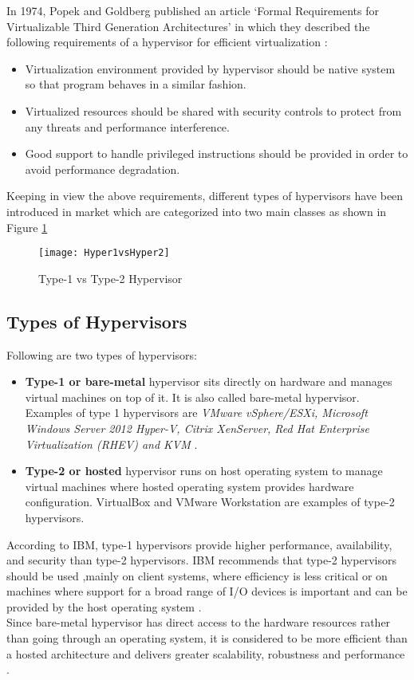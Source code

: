 In 1974, Popek and Goldberg published an article `Formal Requirements for Virtualizable Third Generation Architectures' in which they described the following requirements of a hypervisor for efficient virtualization \cite{popek_goldberg_1973}:
\begin{itemize}
	\item Virtualization environment provided by hypervisor should be native system so that program behaves in a similar fashion.
	\item Virtualized resources should be shared with security controls to protect from any threats and performance interference.
	\item Good support to handle privileged instructions should be provided in order to avoid performance degradation.
\end{itemize}
Keeping in view the above requirements, different types of hypervisors have been introduced in market which are categorized into two main classes as shown in Figure \ref{VirtualTypes}
\begin{figure}[htb]
	\centering
	\texttt{[image: Hyper1vsHyper2]}
	\caption{Type-1 vs Type-2 Hypervisor}
	\label{VirtualTypes}
\end{figure}
\subsection{Types of Hypervisors\label{sec:bbb}}
Following are two types of hypervisors:
\begin{itemize}
	\item \textbf{Type-1 or bare-metal} hypervisor sits directly on hardware and manages virtual machines on top of it. It is also called bare-metal hypervisor. Examples of type 1 hypervisors are \textit{VMware vSphere/ESXi, Microsoft Windows Server 2012 Hyper-V, Citrix XenServer, Red Hat Enterprise Virtualization (RHEV) and KVM} \cite{hypervisor2}.
	\item \textbf{Type-2 or hosted} hypervisor runs on host operating system to manage virtual machines where hosted operating system provides hardware configuration. VirtualBox and VMware	Workstation are examples of type-2 hypervisors.
\end{itemize}
According to IBM, type-1 hypervisors provide higher performance, availability, and security than type-2 hypervisors. IBM recommends that type-2 hypervisors should be used ,mainly on client systems, where efficiency is less critical or on machines where support for a broad range of I/O devices is important and can be provided by the host operating system \cite{searchservervirtualization}.
\\
Since bare-metal hypervisor has direct access to the hardware resources rather than going through
an operating system, it is considered to be more efficient than a hosted architecture and delivers greater scalability, robustness and performance \cite{hypervisor1}. 

